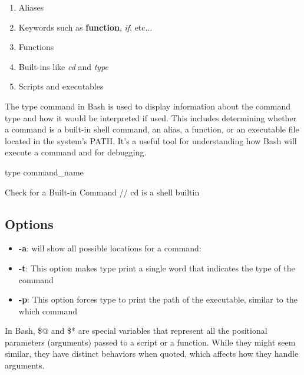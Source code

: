 \documentclass{report}
\begin{document}
    \pagebreak {}
    \bigbreak \noindent 
    \begin{enumerate}
        \item Aliases
        \item Keywords such as \textbf{function}, \textit{if}, etc...
        \item Functions
        \item Built-ins like \textit{cd} and \textit{type}
        \item Scripts and executables
    \end{enumerate}

    \pagebreak 
    \bigbreak \noindent 
    The type command in Bash is used to display information about the command type and how it would be interpreted if used. This includes determining whether a command is a built-in shell command, an alias, a function, or an executable file located in the system's PATH. It's a useful tool for understanding how Bash will execute a command and for debugging.
    \bigbreak \noindent 
    \begin{bashcode}
    type command_name
    \end{bashcode}
    \bigbreak \noindent 
    \begin{bashcode}
    Check for a Built-in Command // cd is a shell builtin
    \end{bashcode}
    \bigbreak \noindent 
    \subsection{Options}
    \begin{itemize}
        \item \textbf{-a}: will show all possible locations for a command:
        \item \textbf{-t}: This option makes type print a single word that indicates the type of the command
        \item \textbf{-p}: This option forces type to print the path of the executable, similar to the which command
    \end{itemize}

    \pagebreak 
    \bigbreak \noindent 
    In Bash, \$@ and \$* are special variables that represent all the positional parameters (arguments) passed to a script or a function. While they might seem similar, they have distinct behaviors when quoted, which affects how they handle arguments.
    \bigbreak \noindent 
\end{document}
